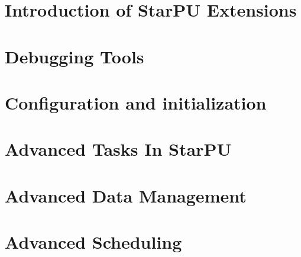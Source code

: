 %
%
%
%
%
\newcommand\starputitle{StarPU Handbook - StarPU Extensions}
\setcounter{tocdepth}{2}


\chapter{Introduction of StarPU Extensions}
\label{index}
\hypertarget{index}{}


\chapter{Debugging Tools}
\label{DebuggingTools}
\hypertarget{DebuggingTools}{}


\chapter{Configuration and initialization}
\label{ConfigurationAndInitialization}
\hypertarget{ConfigurationAndInitialization}{}


\chapter{Advanced Tasks In StarPU}
\label{AdvancedTasksInStarPU}
\hypertarget{AdvancedTasksInStarPU}{}


\chapter{Advanced Data Management}
\label{AdvancedDataManagement}
\hypertarget{AdvancedDataManagement}{}


\chapter{Advanced Scheduling}
\label{AdvancedScheduling}
\hypertarget{AdvancedScheduling}{}



